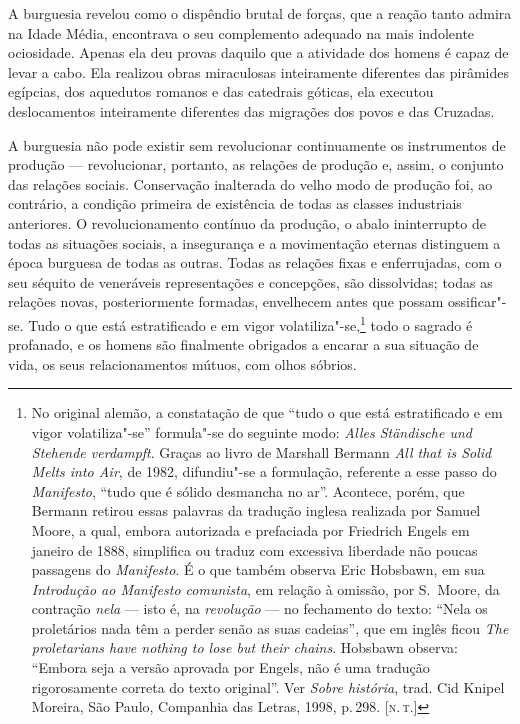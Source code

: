 A burguesia revelou como o dispêndio brutal de forças, que a reação
tanto admira na Idade Média, encontrava o seu complemento adequado na
mais indolente ociosidade. Apenas ela deu provas daquilo que a
atividade dos homens é capaz de levar a cabo. Ela realizou obras
miraculosas inteiramente diferentes das pirâmides egípcias, dos
aquedutos romanos e das catedrais góticas, ela executou deslocamentos
inteiramente diferentes das migrações dos povos e das Cruzadas.

A burguesia não pode existir sem revolucionar continuamente os
instrumentos de produção  ---  revolucionar, portanto, as relações de
produção e, assim, o conjunto das relações sociais. Conservação
inalterada do velho modo de produção foi, ao contrário, a condição
primeira de existência de todas as classes industriais anteriores. O
revolucionamento contínuo da produção, o abalo ininterrupto de todas as
situações sociais, a insegurança e a movimentação eternas distinguem a
época burguesa de todas as outras. Todas as relações fixas e
enferrujadas, com o seu séquito de veneráveis representações e
concepções, são dissolvidas; todas as relações novas, posteriormente
formadas, envelhecem antes que possam ossificar"-se. Tudo o que está
estratificado e em vigor
volatiliza"-se,\footnote{ No original alemão, a constatação de que      \label{2}
``tudo o que está estratificado e em vigor volatiliza"-se'' formula"-se		
do seguinte modo: \textit{Alles Ständische und Stehende verdampft}.
Graças ao livro de Marshall Bermann \textit{All that is Solid
Melts into Air}, de 1982, difundiu"-se a formulação, referente a esse passo do
\textit{Manifesto}, ``tudo que é sólido desmancha no ar''. Acontece,
porém, que Bermann retirou essas palavras da tradução inglesa realizada
por Samuel Moore, a qual, embora autorizada e prefaciada por
Friedrich Engels em janeiro de 1888, simplifica ou traduz com excessiva
liberdade não poucas passagens do \textit{Manifesto}. É o que
também observa Eric Hobsbawn, em sua \textit{Introdução ao Manifesto
comunista}, em relação à omissão, por S.~Moore, da contração \textit{nela}  --- 
isto é, na \textit{revolução}  ---  no fechamento do texto: ``Nela os proletários
nada têm a perder senão as suas cadeias'', que em inglês ficou \textit{The
proletarians have nothing to lose but their chains}. Hobsbawn observa:
``Embora seja a versão aprovada por Engels, não é uma tradução
rigorosamente correta do texto original''. Ver \textit{Sobre história},
trad. Cid Knipel Moreira, São Paulo, Companhia das Letras, 1998,
p.\,298. [\textsc{n.\,t.}]} todo o sagrado é profanado, e os homens são finalmente
obrigados a encarar a sua situação de vida, os seus relacionamentos mútuos,
com olhos sóbrios.


